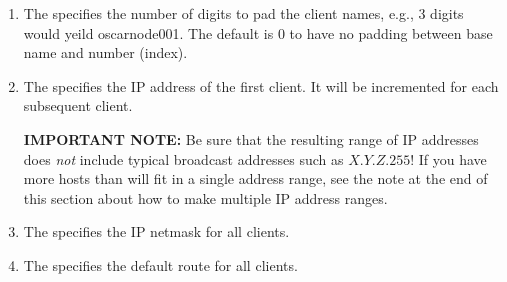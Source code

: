 \begin{enumerate}
\item The  specifies the number of digits to pad the client
names, e.g., 3 digits would yeild oscarnode001.  The default is 0 to have
no padding between base name and number (index).

\item The  specifies the IP address of the first
  client. It will be incremented for each subsequent client.
  
  
  {\bf IMPORTANT NOTE:} Be sure that the resulting range of IP
  addresses does {\em not} include typical broadcast addresses such as
  $X.Y.Z.255$!  If you have more hosts than will fit in a single
  address range, see the note at the end of this section about how to
  make multiple IP address ranges.
  
\item The  specifies the IP netmask for all
  clients.  
  
\item The  specifies the default route for all
  clients.

\end{enumerate}
  

